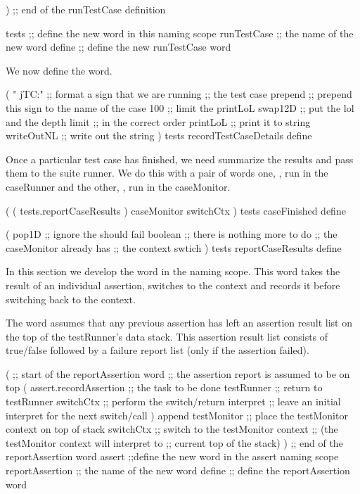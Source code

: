 )            ;; end of the runTestCase definition

tests        ;; define the new word in this naming scope
runTestCase  ;; the name of the new word
define       ;; define the new runTestCase word
\stopJoylolCode

We now define the  word.

\startJoylolCode
(
  "  jTC:"    ;; format a sign that we are running
              ;; the test case
  prepend     ;; prepend this sign to the name of the case
  100         ;; limit the printLoL
  swap12D     ;; put the lol and the depth limit
              ;; in the correct order
  printLoL    ;; print it to string
  writeOutNL  ;; write out the string
)
tests
recordTestCaseDetails
define
\stopJoylolCode
\stopTestSuite


Once a particular test case has finished, we need summarize the results 
and pass them to the suite runner. We do this with a pair of words one, 
, run in the caseRunner and the other, 
, run in the caseMonitor. 

\startJoylolCode
(
  ( tests.reportCaseResults )
  caseMonitor
  switchCtx
)
tests
caseFinished
define
\stopJoylolCode

\startJoylolCode
(
  pop1D   ;; ignore the should fail boolean
          ;; there is nothing more to do
          ;; the caseMonitor already has
          ;; the context swtich 
)
tests
reportCaseResults
define
\stopJoylolCode

\stopTestSuite


In this section we develop the  word in the 
 naming scope. This word takes the result of an individual 
assertion, switches to the  context and records it 
before switching back to the  context. 

The  word assumes that any previous assertion has 
left an assertion result list on the top of the testRunner's data stack. 
This assertion result list consists of true/false followed by a failure 
report list (only if the assertion failed). 

\startJoylolCode
(               ;; start of the reportAssertion word
                ;; the assertion report is assumed to be on top
  (
    assert.recordAssertion  ;; the task to be done
    testRunner  ;; return to testRunner
    switchCtx   ;; perform the switch/return
    interpret   ;; leave an initial interpret for the next switch/call
  )
  append
  testMonitor   ;; place the testMonitor context on top of stack
  switchCtx     ;; switch to the testMonitor context
                ;; (the testMonitor context will interpret to
                ;;  current top of the stack)
)               ;; end of the reportAssertion word
assert          ;;define the new word in the assert naming scope
reportAssertion ;; the name of the new word
define          ;; define the reportAssertion word
\stopJoylolCode
\stopTestSuite

